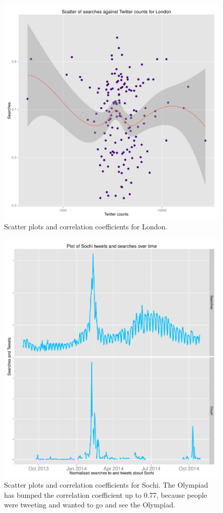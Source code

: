 \documentclass[minf,twoside,singlespacing,parskip,frontabs]{infthesis}
\begin{document}
\begin{figure}[]
\includegraphics[scale=0.65]{London} 
 \caption{Scatter plots and correlation coefficients for London.}
\end{figure}

\begin{figure}[]
\includegraphics[scale=0.6]{Sochi}
\caption{Scatter plots and correlation coefficients for Sochi.  The Olympiad has bumped the correlation coefficient up to 0.77, because people were tweeting and wanted to go and see the Olympiad. }
\end{figure}
\end{document}
